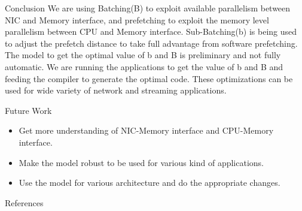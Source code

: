 \documentclass[final]{beamer}
\newlength{\onecolwid}
\begin{document}
\begin{frame}
\begin{columns}[t]

\begin{column}{\onecolwid} %


\begin{exampleblock}{Conclusion}
We are using Batching(B) to exploit available parallelism between NIC and Memory interface, and prefetching to exploit the memory level parallelism between CPU and Memory interface.
Sub-Batching(b) is being used to adjust the prefetch distance to take full advantage from software prefetching. The model to get the optimal value of b and B is preliminary and not fully automatic. We are running the applications to get the value of b and B and feeding the compiler to generate the optimal code. These optimizations can be used for wide variety of network and streaming applications.
\end{exampleblock}


\begin{exampleblock}{Future Work}
\begin{itemize}
\item Get more understanding of NIC-Memory interface and CPU-Memory interface. 
\item Make the model robust to be used for various kind of applications.
\item Use the model for various architecture and do the appropriate changes.
\end{itemize}
\end{exampleblock}


\begin{exampleblock}{References}

\nocite{*} %
\small{
\vspace{1cm}}
\end{exampleblock}


\end{column}
\end{columns}
\end{frame}
\end{document}
